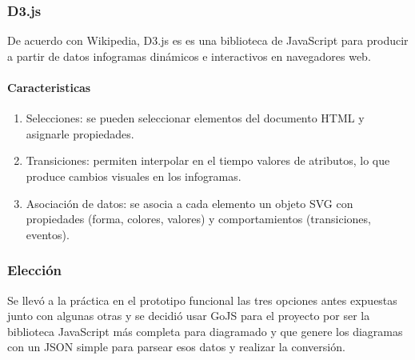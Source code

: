 \subsubsection*{D3.js}

De acuerdo con Wikipedia\cite{wikipedia_contributors_d3js_2020}, D3.js es es una biblioteca de JavaScript para producir a partir de datos infogramas dinámicos e interactivos en navegadores web. 

\paragraph*{Caracteristicas}
\begin{enumerate}
    \item Selecciones: se pueden seleccionar elementos del documento HTML y asignarle propiedades.
    \item Transiciones:  permiten interpolar en el tiempo valores de atributos, lo que produce cambios visuales en los infogramas.
    \item Asociación de datos: se asocia a cada elemento un objeto SVG con propiedades (forma, colores, valores) y comportamientos (transiciones, eventos).
\end{enumerate}

\subsubsection*{Elección}

Se llevó a la práctica en el prototipo funcional las tres opciones antes expuestas junto con algunas otras y se decidió usar GoJS para el proyecto por ser la biblioteca JavaScript más completa para diagramado y que genere los diagramas con un JSON simple para parsear esos datos y realizar la conversión.



